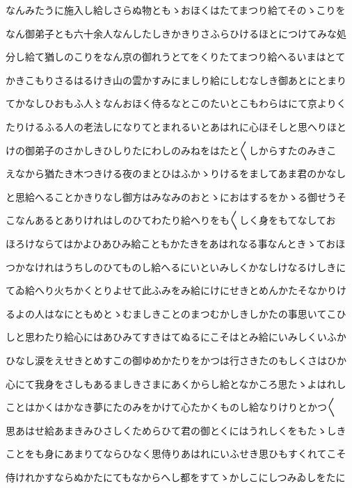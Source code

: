 \documentclass[a4paper,11pt,landscape]{ltjtarticle}
\begin{document}
\par\medskip
なんみたうに施入し給しさらぬ物ともゝおほくはたてまつり給てそのゝこりを
\par\medskip
なん御弟子とも六十余人なんしたしきかきりさふらひけるほとにつけてみな処
\par\medskip
分し給て猶しのこりをなん京の御れうとてをくりたてまつり給へるいまはとて
\par\medskip
かきこもりさるはるけき山の雲かすみにましり給にしむなしき御あとにとまり
\par\medskip
てかなしひおもふ人〻なんおほく侍るなとこのたいとこもわらはにて京よりく
\par\medskip
たりけるふる人の老法しになりてとまれるいとあはれに心ほそしと思へりほと
\par\medskip
けの御弟子のさかしきひしりたにわしのみねをはたと〱しからすたのみきこ
\par\medskip
えなから猶たき木つきける夜のまとひはふかゝりけるをましてあま君のかなし
\par\medskip
と思給へることかきりなし御方はみなみのおとゝにおはするをかゝる御せうそ
\par\medskip
こなんあるとありけれはしのひてわたり給へりをも〱しく身をもてなしてお
\par\medskip
ほろけならてはかよひあひみ給こともかたきをあはれなる事なんときゝておほ
\par\medskip
つかなけれはうちしのひてものし給へるにいといみしくかなしけなるけしきに
\par\medskip
てゐ給へり火ちかくとりよせて此ふみをみ給にけにせきとめんかたそなかりけ
\par\medskip
るよの人はなにともめとゝむましきことのまつむかしきしかたの事思いてこひ
\par\medskip
しと思わたり給心にはあひみてすきはてぬるにこそはとみ給にいみしくいふか
\par\medskip
ひなし涙をえせきとめすこの御ゆめかたりをかつは行さきたのもしくさはひか
\par\medskip
心にて我身をさしもあるましきさまにあくからし給となかころ思たゝよはれし
\par\medskip
ことはかくはかなき夢にたのみをかけて心たかくものし給なりけりとかつ〱
\par\medskip
思あはせ給あまきみひさしくためらひて君の御とくにはうれしくをもたゝしき
\par\medskip
ことをも身にあまりてならひなく思侍りあはれにいふせき思ひもすくれてこそ
\par\medskip
侍けれかすならぬかたにてもなからへし都をすてゝかしこにしつみゐしをたに
\par\medskip
\end{document}

